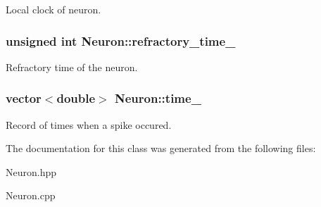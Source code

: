 Local clock of neuron. \hypertarget{classNeuron_a09591c9e23ff936d8479d3abb087439e}{
\subsubsection[{refractory\-\_\-time\-\_\-}]{\setlength{\rightskip}{0pt plus 5cm}unsigned int Neuron\-::refractory\-\_\-time\-\_\-\hspace{0.3cm}{\ttfamily [private]}}}\label{classNeuron_a09591c9e23ff936d8479d3abb087439e}
Refractory time of the neuron. \hypertarget{classNeuron_a7674c161dce2a7990b2ae2ebaa638ff6}{
\subsubsection[{time\-\_\-}]{\setlength{\rightskip}{0pt plus 5cm}vector$<$double$>$ Neuron\-::time\-\_\-\hspace{0.3cm}{\ttfamily [private]}}}\label{classNeuron_a7674c161dce2a7990b2ae2ebaa638ff6}
Record of times when a spike occured. 

The documentation for this class was generated from the following files\-:\begin{DoxyCompactItemize}
\item 
Neuron.\-hpp\item 
Neuron.\-cpp\end{DoxyCompactItemize}
